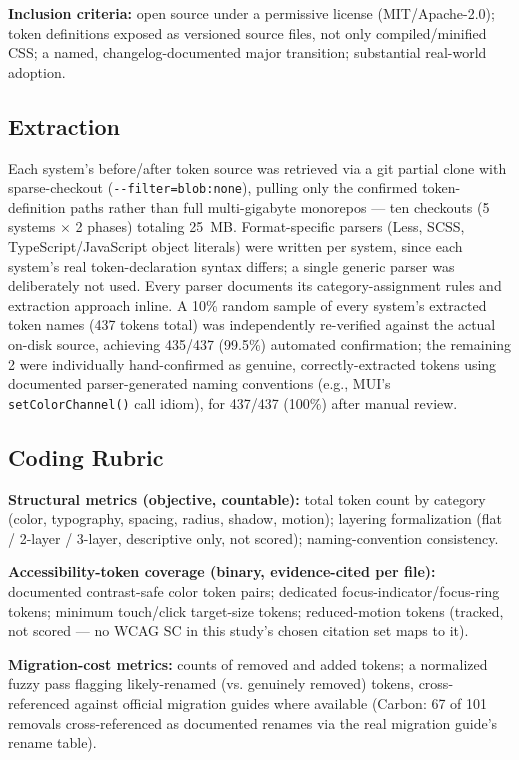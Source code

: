 \documentclass[11pt]{article}
\begin{document}
\textbf{Inclusion criteria:} open source under a permissive license (MIT/Apache-2.0); token definitions exposed as versioned source files, not only compiled/minified CSS; a named, changelog-documented major transition; substantial real-world adoption.

\subsection{Extraction}

Each system's before/after token source was retrieved via a git partial clone with sparse-checkout (\texttt{-{}-filter=blob:none}), pulling only the confirmed token-definition paths rather than full multi-gigabyte monorepos --- ten checkouts (5 systems \(\times\) 2 phases) totaling 25~MB. Format-specific parsers (Less, SCSS, TypeScript/JavaScript object literals) were written per system, since each system's real token-declaration syntax differs; a single generic parser was deliberately not used. Every parser documents its category-assignment rules and extraction approach inline. A 10\% random sample of every system's extracted token names (437 tokens total) was independently re-verified against the actual on-disk source, achieving 435/437 (99.5\%) automated confirmation; the remaining 2 were individually hand-confirmed as genuine, correctly-extracted tokens using documented parser-generated naming conventions (e.g., MUI's \texttt{setColorChannel()} call idiom), for 437/437 (100\%) after manual review.

\subsection{Coding Rubric}

\textbf{Structural metrics (objective, countable):} total token count by category (color, typography, spacing, radius, shadow, motion); layering formalization (flat / 2-layer / 3-layer, descriptive only, not scored); naming-convention consistency.

\textbf{Accessibility-token coverage (binary, evidence-cited per file):} documented contrast-safe color token pairs; dedicated focus-indicator/focus-ring tokens; minimum touch/click target-size tokens; reduced-motion tokens (tracked, not scored --- no WCAG SC in this study's chosen citation set maps to it).

\textbf{Migration-cost metrics:} counts of removed and added tokens; a normalized fuzzy pass flagging likely-renamed (vs. genuinely removed) tokens, cross-referenced against official migration guides where available (Carbon: 67 of 101 removals cross-referenced as documented renames via the real migration guide's rename table).
\end{document}
